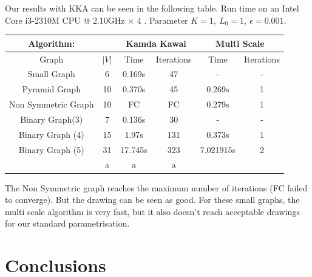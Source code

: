 \documentclass[12pt,a4paper]{article}
\begin{document}
\newpage
Our results with KKA can be seen in the following table. Run time on an  Intel Core i3-2310M CPU @ 2.10GHz $\times$ 4 . Parameter $K=1, \ L_0 = 1, \ \epsilon = 0.001$.
\begin{table}

\begin{tabular}{|c|c||c|c|c|c|}
\hline
Algorithm: & & \multicolumn{2}{|c|}{Kamda Kawai} &  \multicolumn{2}{|c|}{Multi Scale}  \\
\hline
\hline 
Graph & $|V|$ & Time & Iterations & Time & Iterations\\ 
\hline
Small Graph & 6 & 0.169s & 47 &- & -\\ 
\hline 
Pyramid Graph & 10 & 0.370s & 45 &0.269s & 1 \\ 
\hline 
Non Symmetric Graph & 10 & FC & FC & 0.279s & 1\\ 
\hline 
Binary Graph(3) & 7 & 0.136s & 30 & -&-\\ 
\hline 
Binary Graph (4) & 15 & 1.97s & 131 & 0.373s& 1 \\ 
\hline 
Binary Graph (5) & 31 & 17.745s & 323 &7.021915s & 2 \\ 
\hline  & a & a & a	& & \\ 
\hline 
\end{tabular} 
\end{table}
The Non Symmetric graph reaches the maximum number of iterations (FC failed to converge). But the drawing can be seen as good. For these small graphs, the multi scale algorithm is very fast, but it also doesn't reach acceptable drawings for our standard parametrisation.


\section{Conclusions}



\end{document}

